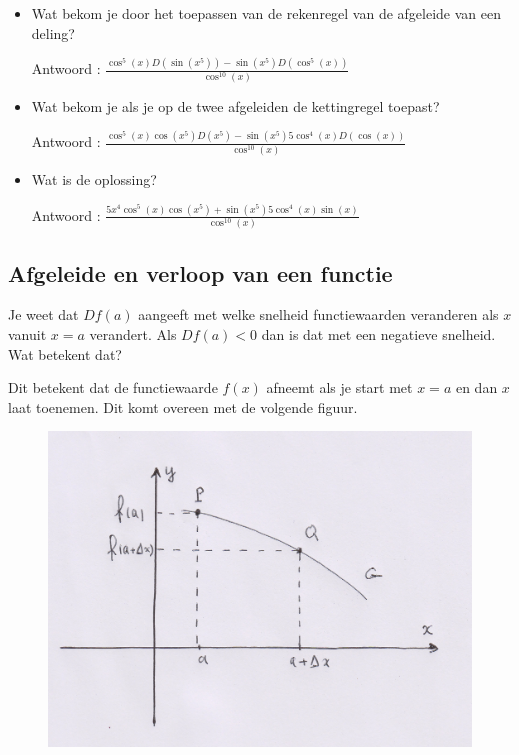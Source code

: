 \begin{enumerate}
	\begin{itemize}
		
		\item Wat bekom je door het toepassen van de rekenregel van de afgeleide van een deling?
		
		Antwoord : $\frac {\cos ^5(x)D\left( \sin \left(  x^5  \right)  \right)-\sin \left(  x^5 \right)D\left( \cos^5(x)  \right)}{\cos ^{10}(x)}$
		
		\item Wat bekom je als je op de twee afgeleiden de kettingregel toepast?
		
		Antwoord : $\frac {\cos ^5(x) \cos \left(  x^5  \right) D\left( x^5 \right)-\sin \left(  x^5 \right)5 \cos^4(x) D(\cos (x))}{\cos ^{10}(x)}$
		
		\item Wat is de oplossing?
		
		Antwoord : $\frac {5x^4\cos ^5(x) \cos \left(  x^5  \right)+\sin \left(  x^5 \right)5 \cos^4(x) \sin (x)}{\cos ^{10}(x)}$
		
	\end{itemize}
	
	
\end{enumerate}


\subsection{Afgeleide en verloop van een functie}

Je weet dat $Df(a)$ aangeeft met welke snelheid functiewaarden veranderen als $x$ vanuit $x=a$ verandert.
Als $Df(a)<0$ dan is dat met een negatieve snelheid. Wat betekent dat?\vspace{5mm}

\noindent Dit betekent dat de functiewaarde $f(x)$ afneemt als je start met $x=a$ en dan $x$ laat toenemen.
Dit komt overeen met de volgende figuur.
\begin{figure}[h]
	\begin{center}
		\includegraphics[height=5 cm]{6_afgeleiden_integralen/inputs/dalend.JPG}
	\end{center}
\end{figure}

